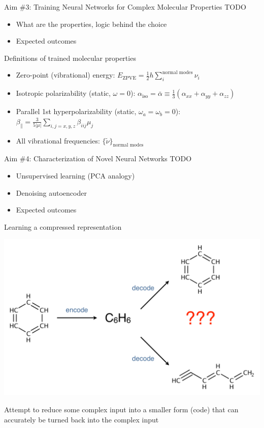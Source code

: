 \documentclass[xetex,compress]{beamer}
\begin{document}

\begin{frame}{Aim \#3: Training Neural Networks for Complex Molecular Properties}
  TODO
  \begin{itemize}
  \item What are the properties, logic behind the choice
  \item Expected outcomes
  \end{itemize}
\end{frame}

\begin{frame}{Definitions of trained molecular properties}
  \begin{itemize}
  \item Zero-point (vibrational) energy: \(E_{\text{ZPVE}} = \frac{1}{2} h \sum_{i}^{\text{normal modes}} \nu_{i}\)
  \item Isotropic polarizability (static, \(\omega = 0\)): \(\alpha_{\text{iso}} = \bar{\alpha} \equiv \frac{1}{3} (\alpha_{xx} + \alpha_{yy} + \alpha_{zz})\)
  \item Parallel 1st hyperpolarizability (static, \(\omega_{a} = \omega_{b} = 0\)): \(\beta_{\parallel} = \frac{3}{5|\mu|} \sum_{i,j=x,y,z} \beta_{iij} \mu_{j}\)
  \item All vibrational frequencies: \(\{\tilde{\nu}\}_{\text{normal modes}}\)
  \end{itemize}
\end{frame}

\begin{frame}{Aim \#4: Characterization of Novel Neural Networks}
  TODO
  \begin{itemize}
  \item Unsupervised learning (PCA analogy)
  \item Denoising autoencoder
  \item Expected outcomes
  \end{itemize}
\end{frame}

\begin{frame}{Learning a compressed representation}
  \begin{center}
    \includegraphics[width=1.00\textwidth]{./figures/autoencoder_example.pdf}
  \end{center}
  Attempt to reduce some complex input into a smaller form (code) that can accurately be turned back into the complex input
\end{frame}
\end{document}
